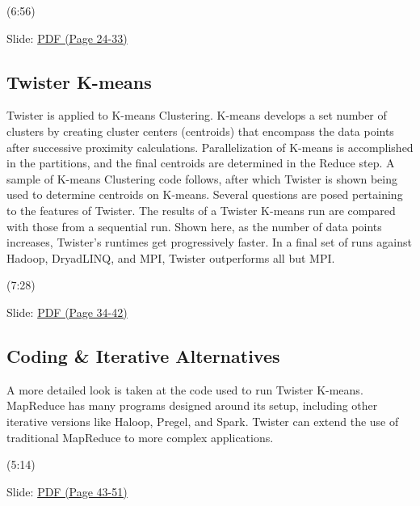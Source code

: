   (6:56)

  Slide:
  \href{https://drive.google.com/open?id=0B88HKpainTSfMFBaNHprbWJwQms}{PDF
  (Page 24-33)}


\subsection{Twister K-means}

Twister is applied to K-means Clustering. K-means develops a set number
of clusters by creating cluster centers (centroids) that encompass the
data points after successive proximity calculations. Parallelization of
K-means is accomplished in the partitions, and the final centroids are
determined in the Reduce step. A sample of K-means Clustering code
follows, after which Twister is shown being used to determine centroids
on K-means. Several questions are posed pertaining to the features of
Twister. The results of a Twister K-means run are compared with those
from a sequential run. Shown here, as the number of data points
increases, Twister's runtimes get progressively faster. In a final set
of runs against Hadoop, DryadLINQ, and MPI, Twister outperforms all but
MPI.




  (7:28)

  Slide:
  \href{https://drive.google.com/open?id=0B88HKpainTSfMFBaNHprbWJwQms}{PDF
  (Page 34-42)}


\subsection{Coding \& Iterative
Alternatives}

A more detailed look is taken at the code used to run Twister K-means.
MapReduce has many programs designed around its setup, including other
iterative versions like Haloop, Pregel, and Spark. Twister can extend
the use of traditional MapReduce to more complex applications.




  (5:14)

  Slide:
  \href{https://drive.google.com/open?id=0B88HKpainTSfMFBaNHprbWJwQms}{PDF
  (Page 43-51)}

